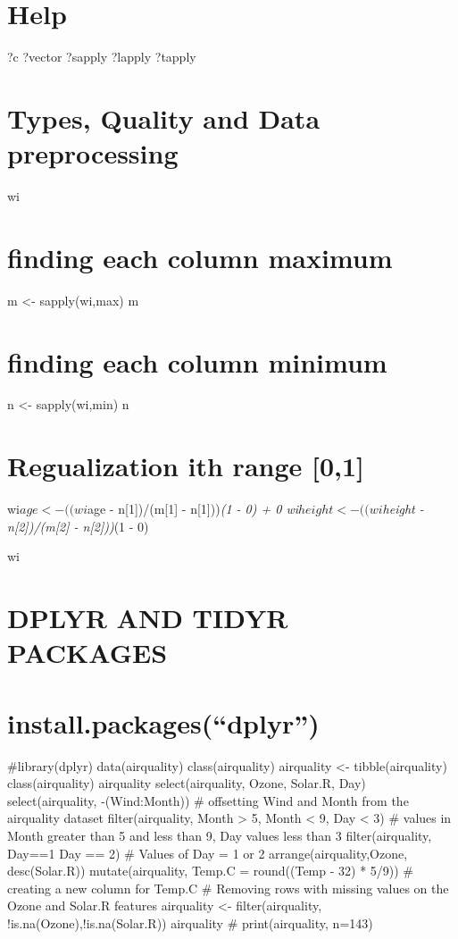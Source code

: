 \documentclass[
]{article}
\begin{document}
\section{Help}\label{help}

?c ?vector ?sapply ?lapply ?tapply

\section{Types, Quality and Data
preprocessing}\label{types-quality-and-data-preprocessing}

wi

\section{finding each column maximum}\label{finding-each-column-maximum}

m \textless- sapply(wi,max) m

\section{finding each column minimum}\label{finding-each-column-minimum}

n \textless- sapply(wi,min) n

\section{Regualization ith range
{[}0,1{]}}\label{regualization-ith-range-01}

wi\(age <- ( (wi\)age - n{[}1{]})/(m{[}1{]} - n{[}1{]}))\emph{(1 - 0) +
0 wi\(height <- ( (wi\)height - n{[}2{]})/(m{[}2{]} - n{[}2{]}))}(1 - 0)

wi

\section{DPLYR AND TIDYR PACKAGES}\label{dplyr-and-tidyr-packages}

\section{install.packages(``dplyr'')}\label{install.packagesdplyr}

\#library(dplyr) data(airquality) class(airquality) airquality
\textless- tibble(airquality) class(airquality) airquality
select(airquality, Ozone, Solar.R, Day) select(airquality,
-(Wind:Month)) \# offsetting Wind and Month from the airquality dataset
filter(airquality, Month \textgreater{} 5, Month \textless{} 9, Day
\textless{} 3) \# values in Month greater than 5 and less than 9, Day
values less than 3 filter(airquality, Day==1 \textbar{} Day == 2) \#
Values of Day = 1 or 2 arrange(airquality,Ozone, desc(Solar.R))
mutate(airquality, Temp.C = round((Temp - 32) * 5/9)) \# creating a new
column for Temp.C \# Removing rows with missing values on the Ozone and
Solar.R features airquality \textless- filter(airquality,
!is.na(Ozone),!is.na(Solar.R)) airquality \# print(airquality, n=143)
\end{document}
